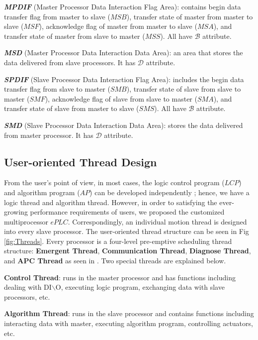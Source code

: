 \documentclass[journal,UTF8]{IEEEtran}
\begin{document}
	\textbf{\emph{MPDIF}} (Master Processor Data Interaction Flag Area): contains begin data transfer flag from master to slave ($MSB$), transfer state of master from master to slave ($MSF$), acknowledge flag of master from master to slave ($MSA$), and transfer state of master from slave to master ($MSS$). All have $\mathcal{B}$ attribute.
	
	\textbf{\emph{MSD}} (Master Processor Data Interaction Data Area): an area that stores the data delivered from slave processors. It has $\mathcal{D}$ attribute.
	
	\textbf{\emph{SPDIF}} (Slave Processor Data Interaction Flag Area): includes the begin data transfer flag from slave to master ($SMB$), transfer state of slave from slave to master ($SMF$), acknowledge flag of slave from slave to master ($SMA$), and transfer state of slave from master to slave ($SMS$). All have $\mathcal{B}$ attribute.
	
	\textbf{\emph{SMD}} (Slave Processor Data Interaction Data Area): stores the data delivered from master processor. It has $\mathcal{D}$ attribute.
	
	\subsection{User-oriented Thread Design}
	From the user's point of view, in most cases, the logic control program ($LCP$) and algorithm program ($AP$) can be developed independently \cite{wu2018customized}; hence, we have a logic thread and algorithm thread. However, in order to satisfying the ever-growing performance requirements of users, we proposed the customized multiprocessor $ePLC$. Correspondingly, an individual motion thread is designed into every slave processor. The user-oriented thread structure can be seen in Fig \ref{fig:Threads}. Every processor is a four-level pre-emptive scheduling thread structure: \textbf{Emergent Thread}, \textbf{Communication Thread}, \textbf{Diagnose Thread}, and \textbf{APC Thread} as seen in \cite{wu2018customized}. Two special threads are explained below.
	
	\textbf{Control Thread}: runs in the master processor and has functions including dealing with DI$\backslash$O, executing logic program, exchanging data with slave processors, etc.
	
	\textbf{Algorithm Thread}: runs in the slave processor and contains functions including interacting data with master, executing algorithm program, controlling actuators, etc.
	
\end{document}
